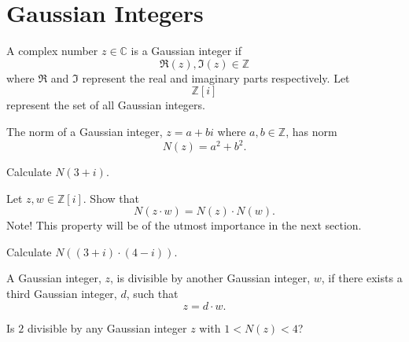 \section{Gaussian Integers}

\begin{definition}
  A complex number \(z \in \mathbb{C} \) is a Gaussian integer if 
  \[
    \Re (z), \Im(z)  \in \mathbb{Z}
  \]
  where \(\Re\) and \(\Im\) represent the real and imaginary parts respectively. Let 
  \[
    \mathbb{Z} \left[i\right]
  \]
  represent the set of all Gaussian integers.
\end{definition}

\begin{definition}[Norm]
  The norm of a Gaussian integer, \(z = a +bi\) where \(a, b \in \mathbb{Z} \), has norm
  \[
    N(z) = a^2 + b^2.
  \]
\end{definition}

\begin{problem}
  Calculate \(N\left(3 + i\right)\).
\end{problem}

\begin{problem}
  Let \(z, w \in \mathbb{Z} \left[i\right]\). Show that 
  \[
    N(z \cdot w) = N(z) \cdot N(w).
  \]
  Note! This property will be of the utmost importance in the next section.
\end{problem}

\begin{problem} Calculate \(N\left((3+i)  \cdot (4-i)\right)\).
\end{problem}

\begin{definition}[Divisibillity]
  A Gaussian integer, \(z\), is divisible by another Gaussian integer, \(w\), if there exists a third Gaussian integer, \(d\), such that
  \[
    z = d  \cdot w.
  \]
\end{definition}

\begin{problem}
  Is \(2\) divisible by any Gaussian integer \(z\) with \(1 < N(z) < 4\)?
\end{problem}

